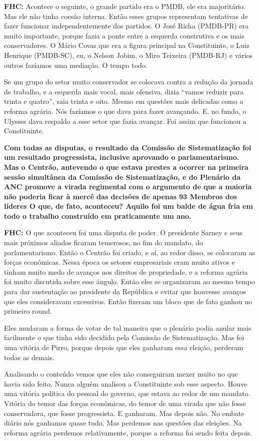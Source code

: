 \textbf{FHC:} Acontece o seguinte, o grande partido era o PMDB, ele era
majoritário. Mas ele não tinha coesão interna. Então esses grupos
representam tentativas de fazer funcionar independentemente dos
partidos. O José Richa (PMDB-PR) era muito importante, porque fazia a
ponte entre a esquerda construtiva e os mais conservadores. O Mário
Covas que era a figura principal na Constituinte, o Luiz Henrique
(PMDB-SC), eu, o Nelson Jobim, o Miro Teixeira (PMDB-RJ) e vários outros
fazíamos uma mediação. O tempo todo.

Se um grupo do setor muito conservador se colocava contra a redução da
jornada de trabalho, e a esquerda mais vocal, mais ofensiva, dizia
``vamos reduzir para trinta e quatro'', saia trinta e oito. Mesmo em
questões mais delicadas como a reforma agrária. Nós fazíamos o que dava
para fazer avançando. E, no fundo, o Ulysses dava respaldo a esse setor
que fazia avançar. Foi assim que funcionou a Constituinte.

\textbf{Com todas as disputas, o resultado da Comissão de Sistematização
foi um resultado progressista, inclusive aprovando o parlamentarismo.
Mas o Centrão, antevendo o que estava prestes a ocorrer na primeira
sessão simultânea da Comissão de Sistematização, e do Plenário da ANC
promove a virada regimental com o argumento de que a maioria não poderia
ficar à mercê das decisões de apenas 93 Membros dos líderes O que, de
fato, aconteceu? Aquilo foi um balde de água fria em todo o trabalho
construído em praticamente um ano.}

\textbf{FHC:} O que aconteceu foi uma disputa de poder. O presidente
Sarney e seus mais próximos aliados ficaram temerosos, no fim do
mandato, do parlamentarismo. Então o Centrão foi criado, e aí, ao redor
disso, se colocaram as forças econômicas. Nessa época os setores
empresariais eram muito ativos e tinham muito medo de avanços nos
direitos de propriedade, e a reforma agrária foi muito discutida sobre
esse ângulo. Então eles se organizaram ao mesmo tempo para dar
sustentação ao presidente da República e evitar que houvesse avanços que
eles consideravam excessivos. Então fizeram um bloco que de fato ganhou
no primeiro round.

Eles mudaram a forma de votar de tal maneira que o plenário podia anular
mais facilmente o que tinha sido decidido pela Comissão de
Sistematização. Mas foi uma vitória de Pirro, porque depois que eles
ganharam essa eleição, perderam todas as demais.

Analisando o conteúdo vemos que eles não conseguiram mexer muito no que
havia sido feito. Nunca alguém analisou a Constituinte sob esse aspecto.
Houve uma vitória política do pessoal do governo, que estava ao redor de
um mandato. Vitória do temor das forças econômicas, do temor de uma
virada que não fosse conservadora, que fosse progressista. E ganharam.
Mas depois não. No embate diário nós ganhamos quase tudo. Mas perdemos
nas questões das eleições. Na reforma agrária perdemos relativamente,
porque a reforma foi sendo feita depois.

